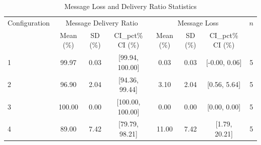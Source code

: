 
\begin{table}[htbp]
\centering
\caption{Message Loss and Delivery Ratio Statistics}
\label{tab:results}
\begin{tabular}{lccccccc}
\hline
Configuration & \multicolumn{3}{c}{Message Delivery Ratio} & \multicolumn{3}{c}{Message Loss} & $n$ \\
 & Mean (\%) & SD (\%) & {CI_pct}\% CI (\%) & Mean (\%) & SD (\%) & {CI_pct}\% CI (\%) & \\
\hline
1 & 99.97 & 0.03 & [99.94, 100.00] & 0.03 & 0.03 & [-0.00, 0.06] & 5 \\
2 & 96.90 & 2.04 & [94.36, 99.44] & 3.10 & 2.04 & [0.56, 5.64] & 5 \\
3 & 100.00 & 0.00 & [100.00, 100.00] & 0.00 & 0.00 & [0.00, 0.00] & 5 \\
4 & 89.00 & 7.42 & [79.79, 98.21] & 11.00 & 7.42 & [1.79, 20.21] & 5 \\
\hline
\end{tabular}
\end{table}

